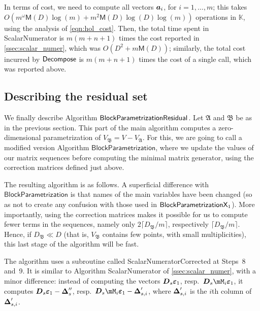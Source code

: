 \documentclass[12pt]{article}
\newcommand{\mat}[1]{\bm{\MakeUppercase{#1}}} %
\newcommand{\row}[1]{\bm{\MakeLowercase{#1}}} %
\newcommand{\col}[1]{\bm{\MakeLowercase{#1}}} %
\newcommand{\mainalgoname}{\mathsf{ BlockParametrization}}
\def\M {\ensuremath{\mathsf{M}}}
\def\K{\mathbb{K}}
\def\K {\ensuremath{\mathbb{K}}}
\begin{document}
In terms of cost, we need to compute all vectors $\row{a}_i$, for
$i=1,\dots,m$; this takes $ O(m^{\omega} \M(D) \log(m) + m^2
\M(D)\log(D)\log(m))$ operations in $\K$, using the analysis of
\cref{eqn:hol_cost}. Then, the total time spent in {\sf
  ScalarNumerator} is $m(m+n+1)$ times the cost reported in
\cref{ssec:scalar_numer}, which was $O(D^2 + m\M(D))$; similarly, the
total cost incurred by ${\sf Decompose}$ is $m(m+n+1)$ times the cost of
a single call, which was reported above.


\subsection{Describing the residual set}
 
We finally describe Algorithm $\mainalgoname{\sf Residual}$.  Let
$\mathfrak{A}$ and $\mathfrak{B}$ be as in the previous section.  This
part of the main algorithm computes a zero-dimensional parametrization
of $V_\mathfrak{B}=V-V_\mathfrak{A}$. For this, we are going to call a
modified version Algorithm $\mathsf{BlockParametrization}$, where we
update the values of our matrix sequences before computing the minimal
matrix generator, using the correction matrices defined just above.

The resulting algorithm is as follows. A superficial difference with
$\mathsf{BlockParametrization}$ is that names of the main variables
have been changed (so as not to create any confusion with those used
in $\mainalgoname{\sf X}_1$). More importantly, using the correction
matrices makes it possible for us to compute fewer terms in the
sequences, namely only $2\lceil D_\mathfrak{B}/m\rceil$, respectively
$\lceil D_\mathfrak{B}/m\rceil$. Hence, if $D_\mathfrak{B} \ll D$
(that is, $V_\mathfrak{B}$ contains few points, with small
multiplicities), this last stage of the algorithm will be fast.

The algorithm uses a subroutine called {\sf ScalarNumeratorCorrected}
at Steps~8 and~9.  It is similar to Algorithm {\sf ScalarNumerator} of
\cref{ssec:scalar_numer}, with a minor difference: instead of computing the
vectors $\mat{D}_s \col{\varepsilon}_1$, resp.\ $\mat{D}_s\mM_i
\col{\varepsilon}_1$, it computes $\mat{D}_s
\col{\varepsilon}_1-\mat{\Delta}''_s$, resp.\ $\mat{D}_s\mM_i
\col{\varepsilon}_1-\mat{\Delta}'_{s,i}$, where $\mat{\Delta}'_{s,i}$
is the $i$th column of $\mat{\Delta}'_{s,i}$.
\end{document}
